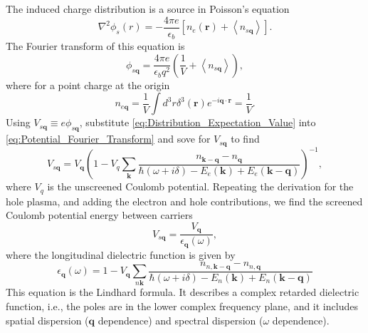 The induced charge distribution is a source in Poisson's equation
\begin{equation}
\nabla^{2}\phi_{s}(r)=-\frac{4\pi e}{\epsilon_{b}}\left[n_{e}(\mathbf{r})+\left\langle n_{s\mathbf{q}}\right\rangle \right].\end{equation}
The Fourier transform of this equation is \begin{equation}
\phi_{s\mathbf{q}}=\frac{4\pi e}{\epsilon_{b}q^{2}}\left(\frac{1}{V}+\left\langle n_{s\mathbf{q}}\right\rangle \right),\label{eq:Potential_Fourier_Transform}\end{equation}
where for a point charge at the origin \begin{equation}
n_{e\mathbf{q}}=\frac{1}{V}\int d^{3}r\delta^{3}\left(\mathbf{r}\right)e^{-i\mathbf{q}\cdot\mathbf{r}}=\frac{1}{V}.\end{equation}
Using $V_{s\mathbf{q}}\equiv e\phi_{s\mathbf{q}}$, substitute \ref{eq:Distribution_Expectation_Value}
into \ref{eq:Potential_Fourier_Transform} and sove for $V_{s\mathbf{q}}$
to find \begin{equation}
V_{s\mathbf{q}}=V_{\mathbf{q}}\left(1-V_{q}\sum_{\mathbf{k}}\frac{n_{\mathbf{k}-\mathbf{q}}-n_{\mathbf{q}}}{\hbar\left(\omega+i\delta\right)-E_{e}(\mathbf{k})+E_{e}(\mathbf{k}-\mathbf{q})}\right)^{-1},\end{equation}
where $V_{q}$ is the unscreened Coulomb potential. Repeating the
derivation for the hole plasma, and adding the electron and hole contributions,
we find the screened Coulomb potential energy between carriers \ \begin{equation}
V_{s\mathbf{q}}=\frac{V_{\mathbf{q}}}{\epsilon_{\mathbf{q}}(\omega)},\end{equation}
where the longitudinal dielectric function is given by \begin{equation}
\epsilon_{\mathbf{q}}(\omega)=1-V_{\mathbf{q}}\sum_{n\mathbf{k}}\frac{n_{n,\mathbf{k}-\mathbf{q}}-n_{n,\mathbf{q}}}{\hbar\left(\omega+i\delta\right)-E_{n}(\mathbf{k})+E_{n}(\mathbf{k}-\mathbf{q})}\end{equation}
This equation is the Lindhard formula. It describes a complex retarded
dielectric function, i.e., the poles are in the lower complex frequency
plane, and it includes spatial dispersion ($\mathbf{q}$ dependence)
and spectral dispersion ($\omega$ dependence). 

